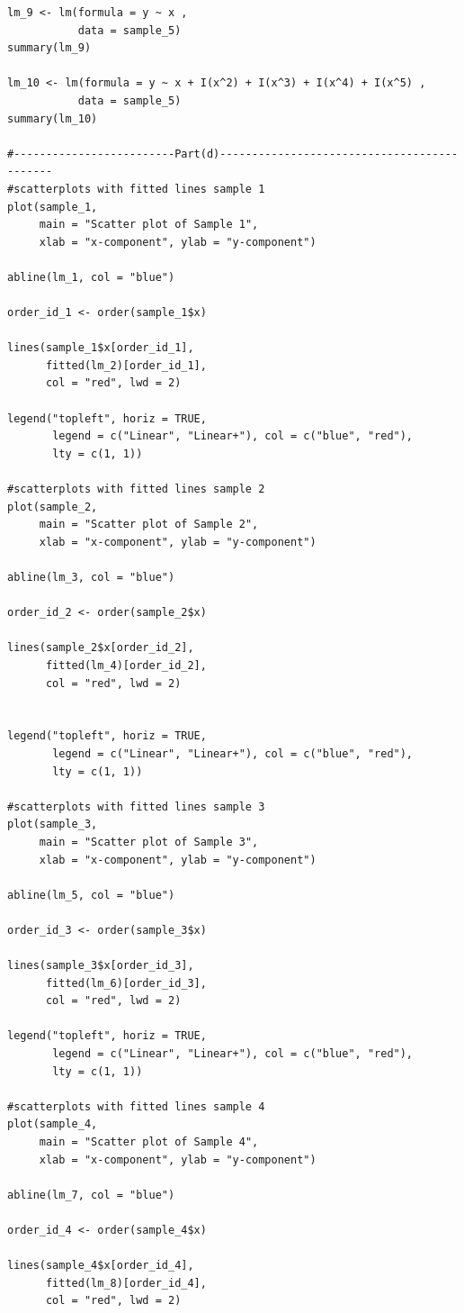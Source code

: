 \documentclass{article}
\begin{document}
\begin{verbatim}
lm_9 <- lm(formula = y ~ x ,
           data = sample_5)
summary(lm_9)

lm_10 <- lm(formula = y ~ x + I(x^2) + I(x^3) + I(x^4) + I(x^5) ,
           data = sample_5)
summary(lm_10)

#-------------------------Part(d)--------------------------------------------
#scatterplots with fitted lines sample 1
plot(sample_1,
     main = "Scatter plot of Sample 1",
     xlab = "x-component", ylab = "y-component")

abline(lm_1, col = "blue")

order_id_1 <- order(sample_1$x)

lines(sample_1$x[order_id_1],
      fitted(lm_2)[order_id_1],
      col = "red", lwd = 2)

legend("topleft", horiz = TRUE,
       legend = c("Linear", "Linear+"), col = c("blue", "red"),
       lty = c(1, 1))

#scatterplots with fitted lines sample 2
plot(sample_2,
     main = "Scatter plot of Sample 2",
     xlab = "x-component", ylab = "y-component")

abline(lm_3, col = "blue")

order_id_2 <- order(sample_2$x)

lines(sample_2$x[order_id_2],
      fitted(lm_4)[order_id_2],
      col = "red", lwd = 2)


legend("topleft", horiz = TRUE,
       legend = c("Linear", "Linear+"), col = c("blue", "red"),
       lty = c(1, 1))

#scatterplots with fitted lines sample 3
plot(sample_3,
     main = "Scatter plot of Sample 3",
     xlab = "x-component", ylab = "y-component")

abline(lm_5, col = "blue")

order_id_3 <- order(sample_3$x)

lines(sample_3$x[order_id_3],
      fitted(lm_6)[order_id_3],
      col = "red", lwd = 2)

legend("topleft", horiz = TRUE,
       legend = c("Linear", "Linear+"), col = c("blue", "red"),
       lty = c(1, 1))

#scatterplots with fitted lines sample 4
plot(sample_4,
     main = "Scatter plot of Sample 4",
     xlab = "x-component", ylab = "y-component")

abline(lm_7, col = "blue")

order_id_4 <- order(sample_4$x)

lines(sample_4$x[order_id_4],
      fitted(lm_8)[order_id_4],
      col = "red", lwd = 2)


\end{verbatim}
\end{document}
